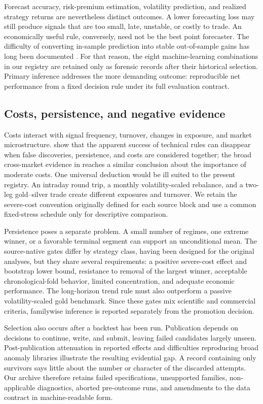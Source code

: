 Forecast accuracy, risk-premium estimation, volatility prediction, and realized strategy returns are nevertheless distinct outcomes. A lower forecasting loss may still produce signals that are too small, late, unstable, or costly to trade. An economically useful rule, conversely, need not be the best point forecaster. The difficulty of converting in-sample prediction into stable out-of-sample gains has long been documented \citep{welch2008}. For that reason, the eight machine-learning combinations in our registry are retained only as forensic records after their historical selection. Primary inference addresses the more demanding outcome: reproducible net performance from a fixed decision rule under its full evaluation contract.

\subsection{Costs, persistence, and negative evidence}

Costs interact with signal frequency, turnover, changes in exposure, and market microstructure. \citet{bajgrowicz2012} show that the apparent success of technical rules can disappear when false discoveries, persistence, and costs are considered together; the broad cross-market evidence in \citet{rink2023} reaches a similar conclusion about the importance of moderate costs. One universal deduction would be ill suited to the present registry. An intraday round trip, a monthly volatility-scaled rebalance, and a two-leg gold--silver trade create different exposures and turnover. We retain the severe-cost convention originally defined for each source block and use a common fixed-stress schedule only for descriptive comparison.

Persistence poses a separate problem. A small number of regimes, one extreme winner, or a favorable terminal segment can support an unconditional mean. The source-native gates differ by strategy class, having been designed for the original analyses, but they share several requirements: a positive severe-cost effect and bootstrap lower bound, resistance to removal of the largest winner, acceptable chronological-fold behavior, limited concentration, and adequate economic performance. The long-horizon trend rule must also outperform a passive volatility-scaled gold benchmark. Since these gates mix scientific and commercial criteria, familywise inference is reported separately from the promotion decision.

Selection also occurs after a backtest has been run. Publication depends on decisions to continue, write, and submit, leaving failed candidates largely unseen. Post-publication attenuation in reported effects \citep{mclean2016} and difficulties reproducing broad anomaly libraries \citep{hou2020} illustrate the resulting evidential gap. A record containing only survivors says little about the number or character of the discarded attempts. Our archive therefore retains failed specifications, unsupported families, non-applicable diagnostics, aborted pre-outcome runs, and amendments to the data contract in machine-readable form.

